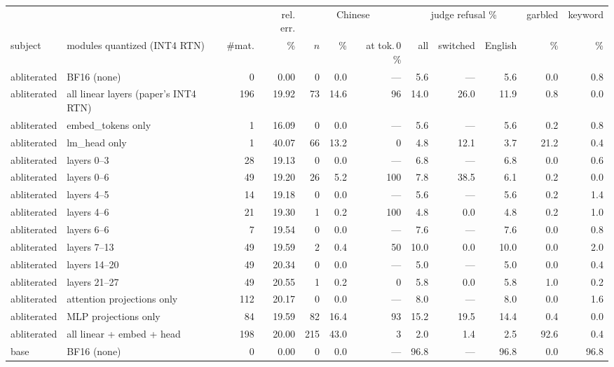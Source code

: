 \setlength{\tabcolsep}{2.2pt}
\begin{tabular}{@{}l l r r r r r r r r r r@{}}
\toprule
& & & rel. err. & \multicolumn{3}{c}{Chinese} & \multicolumn{3}{c}{judge refusal \%} & garbled & keyword \\
\cmidrule(lr){5-7}\cmidrule(lr){8-10}
subject & modules quantized (INT4 RTN) & \#mat. & \% & $n$ & \% & at tok.\,0 \% & all & switched & English & \% & \% \\
\midrule
abliterated & BF16 (none) & 0 & 0.00 & 0 & 0.0 & --- & 5.6 & --- & 5.6 & 0.0 & 0.8 \\
abliterated & all linear layers (paper's INT4 RTN) & 196 & 19.92 & 73 & 14.6 & 96 & 14.0 & 26.0 & 11.9 & 0.8 & 0.0 \\
abliterated & embed\_tokens only & 1 & 16.09 & 0 & 0.0 & --- & 5.6 & --- & 5.6 & 0.2 & 0.8 \\
abliterated & lm\_head only & 1 & 40.07 & 66 & 13.2 & 0 & 4.8 & 12.1 & 3.7 & 21.2 & 0.4 \\
abliterated & layers 0--3 & 28 & 19.13 & 0 & 0.0 & --- & 6.8 & --- & 6.8 & 0.0 & 0.6 \\
abliterated & layers 0--6 & 49 & 19.20 & 26 & 5.2 & 100 & 7.8 & 38.5 & 6.1 & 0.2 & 0.0 \\
abliterated & layers 4--5 & 14 & 19.18 & 0 & 0.0 & --- & 5.6 & --- & 5.6 & 0.2 & 1.4 \\
abliterated & layers 4--6 & 21 & 19.30 & 1 & 0.2 & 100 & 4.8 & 0.0 & 4.8 & 0.2 & 1.0 \\
abliterated & layers 6--6 & 7 & 19.54 & 0 & 0.0 & --- & 7.6 & --- & 7.6 & 0.0 & 0.8 \\
abliterated & layers 7--13 & 49 & 19.59 & 2 & 0.4 & 50 & 10.0 & 0.0 & 10.0 & 0.0 & 2.0 \\
abliterated & layers 14--20 & 49 & 20.34 & 0 & 0.0 & --- & 5.0 & --- & 5.0 & 0.0 & 0.4 \\
abliterated & layers 21--27 & 49 & 20.55 & 1 & 0.2 & 0 & 5.8 & 0.0 & 5.8 & 1.0 & 0.2 \\
abliterated & attention projections only & 112 & 20.17 & 0 & 0.0 & --- & 8.0 & --- & 8.0 & 0.0 & 1.6 \\
abliterated & MLP projections only & 84 & 19.59 & 82 & 16.4 & 93 & 15.2 & 19.5 & 14.4 & 0.4 & 0.0 \\
abliterated & all linear + embed + head & 198 & 20.00 & 215 & 43.0 & 3 & 2.0 & 1.4 & 2.5 & 92.6 & 0.4 \\
base & BF16 (none) & 0 & 0.00 & 0 & 0.0 & --- & 96.8 & --- & 96.8 & 0.0 & 96.8 \\

\end{tabular}
